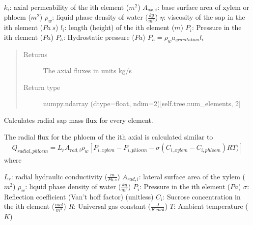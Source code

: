 \documentclass[letterpaper,10pt,english]{sphinxmanual}
\begin{document}
\begin{fulllineitems}
\begin{fulllineitems}
\(k_i\): axial permeability of the ith element (\(m^2\))
\(A_{ax,i}\): base surface area of xylem or phloem (\(m^2\))
\(\rho_w\): liquid phase density of water (\(\frac{kg}{m^3}\))
\(\eta\): viscosity of the sap in the ith element (\(Pa \: s\))
\(l_i\): length (height) of the ith element (\(m\))
\(P_{i}\): Pressure in the ith element (\(Pa\))
\(P_h\): Hydrostatic pressure (\(Pa\)) \(P_h = \rho_w a_{gravitation} l_i\)
\begin{quote}\begin{description}
\item[{Returns}] \leavevmode
The axial fluxes in units kg/s

\item[{Return type}] \leavevmode
numpy.ndarray (dtype=float, ndim=2){[}self.tree.num\_elements, 2{]}

\end{description}\end{quote}

\end{fulllineitems}


\begin{fulllineitems}
\label{\detokenize{index:src.model.Model.radial_fluxes}}
Calculates radial sap mass flux for every element.

The radial flux for the phloem of the ith axial is calculated similar to
\begin{equation*}
\begin{split}Q_{radial,phloem} = L_r A_{rad,i}\rho_{w}
[P_{i,xylem} - P_{i,phloem} - \sigma(C_{i,xylem} - C_{i,phloem})RT)]\end{split}
\end{equation*}
where

\(L_r\): radial hydraulic conductivity (\(\frac{m}{Pa \: s}\))
\(A_{rad,i}\): lateral surface area of the xylem (\(m^2\))
\(\rho_w\): liquid phase density of water (\(\frac{kg}{m^3}\))
\(P_{i}\): Pressure in the ith element (\(Pa\))
\(\sigma\): Reflection coefficient (Van’t hoff factor) (unitless)
\(C_{i}\): Sucrose concentration in the ith element (\(\frac{mol}{m^3}\))
\(R\): Universal gas constant (\(\frac{J}{K \: mol}\))
\(T\): Ambient temperature (\(K\))


\end{fulllineitems}
\end{fulllineitems}
\end{document}

